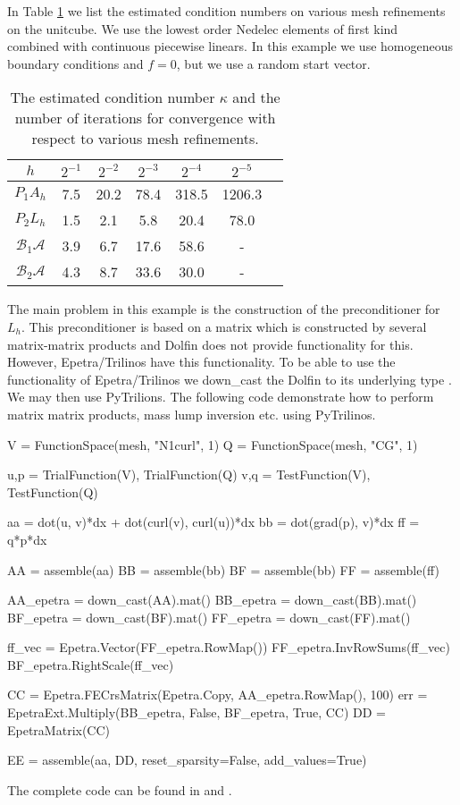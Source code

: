 In Table \ref{table:hodge} we list the estimated condition numbers on various mesh refinements
on the unitcube. We use the  lowest order Nedelec elements of first kind~\cite{Nedelec:1980:MFE} combined with continuous piecewise linears.
In this example we use homogeneous boundary conditions and $f=0$, but we use a random start vector. 
\begin{table}
\begin{center}
\begin{tabular}{|c||c|c|c|c|c|c|}
\hline
$h$ & $2^{-1}$ & $2^{-2}$ & $2^{-3}$ & $2^{-4}$  & $2^{-5}$ \\ \hline 
$ P_1 A_h$ & 7.5 & 20.2 & 78.4 & 318.5 & 1206.3 \\ \hline
$ P_2 L_h$ & 1.5 & 2.1  & 5.8  & 20.4 & 78.0 \\ \hline
$\mathcal{B}_1 \mathcal{A}$ & 3.9 & 6.7 & 17.6 & 58.6 & - \\ \hline
$\mathcal{B}_2 \mathcal{A}$ & 4.3 & 8.7 & 33.6 & 30.0 & - \\ \hline
\end{tabular}
\caption{The estimated condition number $\kappa$ and the number of iterations for 
  convergence with respect to various mesh refinements.}  \label{table:hodge}
\end{center}
\end{table}

The main problem in this example is the construction of the preconditioner
for $L_h$. This preconditioner is based on a matrix which is constructed by 
several matrix-matrix products and Dolfin does not provide functionality for
this. However, Epetra/Trilinos have this functionality. To be able 
to use the functionality of Epetra/Trilinos we down\_cast the Dolfin 
to its underlying type . We may then use PyTrilions. 
The following code demonstrate how to perform matrix matrix products, mass lump inversion  etc. using 
PyTrilinos. 
\begin{python}
V = FunctionSpace(mesh, "N1curl", 1)
Q = FunctionSpace(mesh, "CG", 1)

u,p = TrialFunction(V), TrialFunction(Q)
v,q = TestFunction(V), TestFunction(Q)

aa = dot(u, v)*dx + dot(curl(v), curl(u))*dx   
bb = dot(grad(p), v)*dx  
ff = q*p*dx  

AA = assemble(aa) 
BB = assemble(bb) 
BF = assemble(bb) 
FF = assemble(ff)

AA_epetra = down_cast(AA).mat()
BB_epetra = down_cast(BB).mat()
BF_epetra = down_cast(BF).mat()
FF_epetra = down_cast(FF).mat()

ff_vec = Epetra.Vector(FF_epetra.RowMap())
FF_epetra.InvRowSums(ff_vec)
BF_epetra.RightScale(ff_vec)

CC = Epetra.FECrsMatrix(Epetra.Copy, AA_epetra.RowMap(), 100)
err = EpetraExt.Multiply(BB_epetra, False, BF_epetra, True, CC) 
DD = EpetraMatrix(CC)

EE = assemble(aa, DD, reset_sparsity=False, add_values=True)
\end{python}
The complete code can be found in  and . 


